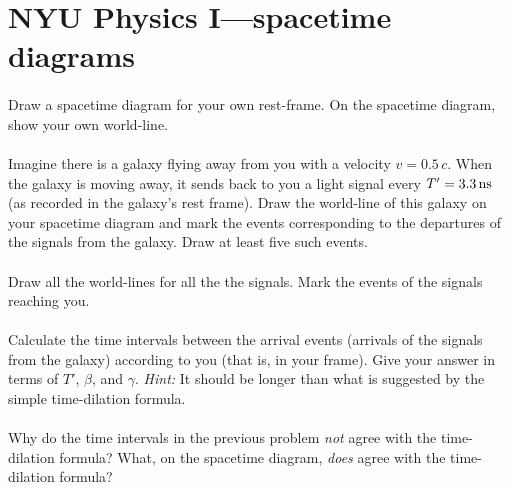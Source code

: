\documentclass[12pt]{article}
\begin{document}
\section*{NYU Physics I---spacetime diagrams}

\paragraph{\theproblem}%
Draw a spacetime diagram for your own rest-frame.  On the spacetime
diagram, show your own world-line.

\paragraph{\theproblem}%
Imagine there is a galaxy flying away from you with a velocity $v =
0.5\,c$. When the galaxy is moving away, it sends back to you a light
signal every $T'=3.3\,\mathrm{ns}$ (as recorded in the galaxy's rest frame).
Draw the world-line of this galaxy on your spacetime diagram and mark
the events corresponding to the departures of the signals from the
galaxy.  Draw at least five such events.

\paragraph{\theproblem}%
Draw all the world-lines for all the the signals.  Mark the events of
the signals reaching you.

\paragraph{\theproblem}%
Calculate the time intervals between the arrival events (arrivals of
the signals from the galaxy) according to you (that is, in your
frame).  Give your answer in terms of $T'$, $\beta$, and $\gamma$.
\textsl{Hint:} It should be longer than what is suggested by the
simple time-dilation formula.

\paragraph{\theproblem}%
Why do the time intervals in the previous problem \emph{not} agree
with the time-dilation formula?  What, on the spacetime diagram,
\emph{does} agree with the time-dilation formula?
\end{document}
